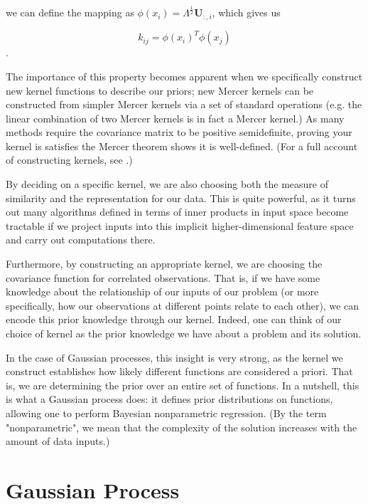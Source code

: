 \documentclass[12pt]{article}
\begin{document}
we can define the mapping as $\phi(x_i)=\Lambda^{\frac{1}{2}}\textbf{U}_{:,i}$, which gives us 

\begin{equation}
k_{ij}=\phi(x_i)^{T}\phi(x_j)
\end{equation}.

The importance of this property becomes apparent when we specifically construct new kernel functions to describe our priors; new Mercer kernels can be constructed from simpler Mercer kernels via a set of standard operations (e.g. the linear combination of two Mercer kernels is in fact a Mercer kernel.) As many methods require the covariance matrix to be positive semidefinite, proving your kernel is satisfies the Mercer theorem shows it is well-defined. (For a full account of constructing kernels, see \cite{Schoelkopf}.)


By deciding on a specific kernel, we are also choosing both the measure of similarity and the representation for our data. This is quite powerful, as it turns out many algorithms defined in terms of inner products in input space become tractable if we project inputs into this implicit higher-dimensional feature space and carry out computations there. 

Furthermore, by constructing an appropriate kernel, we are choosing the covariance function for correlated observations. That is, if we have some knowledge about the relationship of our inputs of our problem (or more specifically, how our observations at different points relate to each other), we can encode this prior knowledge through our kernel. Indeed, one can think of our choice of kernel as the prior knowledge we have about a problem and its solution.

In the case of Gaussian processes, this insight is very strong, as the kernel we construct establishes how likely different functions are considered a priori. That is, we are determining the prior over an entire set of functions. In a nutshell, this is what a Gaussian process does: it defines prior distributions on functions, allowing one to perform Bayesian nonparametric regression. (By the term "nonparametric", we mean that the complexity of the solution increases with the amount of data inputs.)




\section{Gaussian Process}
\end{document}
